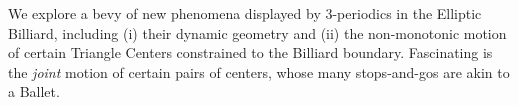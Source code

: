 We explore a bevy of new phenomena displayed by 3-periodics in the Elliptic Billiard, including (i) their dynamic geometry and (ii) the non-monotonic motion of certain Triangle Centers constrained to the Billiard boundary. Fascinating is the {\em joint} motion of certain pairs of centers, whose many stops-and-gos are akin to a Ballet.